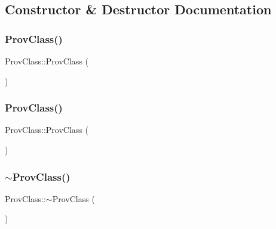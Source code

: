 \subsection{Constructor \& Destructor Documentation}
\mbox{\label{class_prov_class_ab977253f809da49728f2e46c4afe5e91}} 
\subsubsection{\texorpdfstring{Prov\+Class()}{ProvClass()}\hspace{0.1cm}{\footnotesize\ttfamily [1/2]}}
{\footnotesize\ttfamily Prov\+Class\+::\+Prov\+Class (\begin{DoxyParamCaption}{ }\end{DoxyParamCaption})}

\mbox{\label{class_prov_class_a4d4b6fb1dce8565e3760df40f92cab5a}} 
\subsubsection{\texorpdfstring{Prov\+Class()}{ProvClass()}\hspace{0.1cm}{\footnotesize\ttfamily [2/2]}}
{\footnotesize\ttfamily Prov\+Class\+::\+Prov\+Class (\begin{DoxyParamCaption}\item[{const \hyperlink{class_prov_class}{Prov\+Class} \&}]{ }\end{DoxyParamCaption})}

\mbox{\label{class_prov_class_ae0d2a847764e700a0af245feff912c87}} 
\subsubsection{\texorpdfstring{$\sim$\+Prov\+Class()}{~ProvClass()}}
{\footnotesize\ttfamily Prov\+Class\+::$\sim$\+Prov\+Class (\begin{DoxyParamCaption}{ }\end{DoxyParamCaption})}



